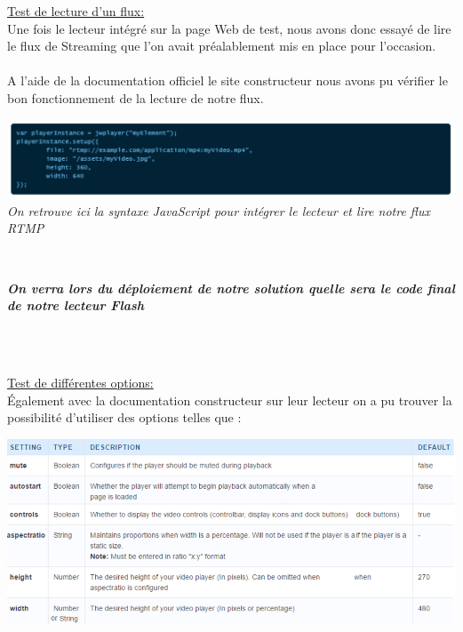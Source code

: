 \documentclass{report}
\begin{document}
    \underline{Test de lecture d’un flux:}\\
     
    Une fois le lecteur intégré sur la page Web de test, nous avons donc essayé de lire le flux de Streaming que l’on avait préalablement mis en place pour l'occasion.
    \\
    \\
    A l’aide de la documentation officiel le site constructeur nous avons pu vérifier le bon fonctionnement de la lecture de notre flux.
    \\
    \begin{center}
    \includegraphics[width=16cm]{img/jwplayer1.PNG}
    \textit{\small{On retrouve ici la syntaxe JavaScript pour intégrer le lecteur et lire notre flux RTMP}}
    \end{center}

    
    \hfill{\\}
    
    \begin{center}
    \textbf{\textit{On verra lors du déploiement de notre solution quelle sera le code final de notre lecteur Flash}}
    \end{center}
    \\
    
    \hfill{\\}
    
     \underline{Test de différentes options:}\\
     
    Également avec la documentation constructeur sur leur lecteur on a pu trouver la possibilité d’utiliser des options telles que :

    \begin{center}
    \includegraphics[width=16.5cm]{img/jwplayer.PNG}
        \end{center}
    
\end{document}
